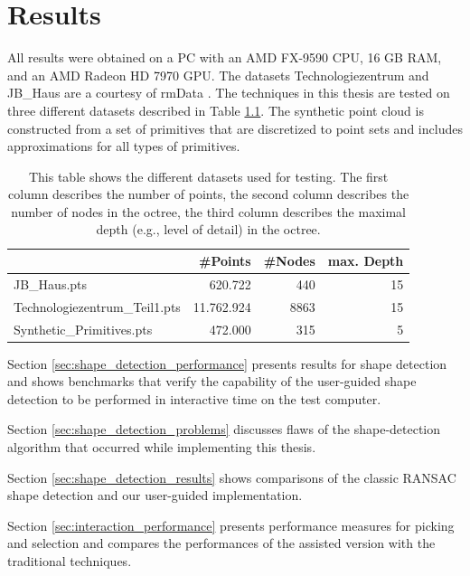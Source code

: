 \chapter{Results}
\label{chap:results}

All results were obtained on a PC with an AMD FX-9590 CPU, 16 GB RAM, and an AMD Radeon HD 7970 GPU. The datasets Technologiezentrum and JB\_Haus are a courtesy of rmData \cite{rmdata}. The techniques in this thesis are tested on three different datasets described in Table \ref{tab:datasets}. The synthetic point cloud is constructed from a set of primitives that are discretized to point sets and includes approximations for all types of primitives. 

\begin{table}
\centering
\begin{tabular}{ l | r | r | r }
						& \textbf{\#Points} & \textbf{\#Nodes}	& \textbf{max. Depth} \\
    \hline
  JB\_Haus.pts                  & 620.722           & 440   & 15 \\
  Technologiezentrum\_Teil1.pts	& 11.762.924        & 8863  & 15 \\
  Synthetic\_Primitives.pts     & 472.000           & 315   & 5 \\
\end{tabular}
\caption[Table of point-cloud datasets]
{This table shows the different datasets used for testing. The first column describes the number of points, the second column describes the number of nodes in the octree, the third column describes the maximal depth (e.g., level of detail) in the octree. } 
\label{tab:datasets}
\end{table}


Section \ref{sec:shape_detection_performance} presents results for shape detection and shows benchmarks that verify the capability of the user-guided shape detection to be performed in interactive time on the test computer.

Section \ref{sec:shape_detection_problems} discusses flaws of the shape-detection algorithm that occurred while implementing this thesis.

Section \ref{sec:shape_detection_results} shows comparisons of the classic RANSAC shape detection and our user-guided implementation. 

Section \ref{sec:interaction_performance} presents performance measures for picking and selection and compares the performances of the assisted version with the traditional techniques. 

